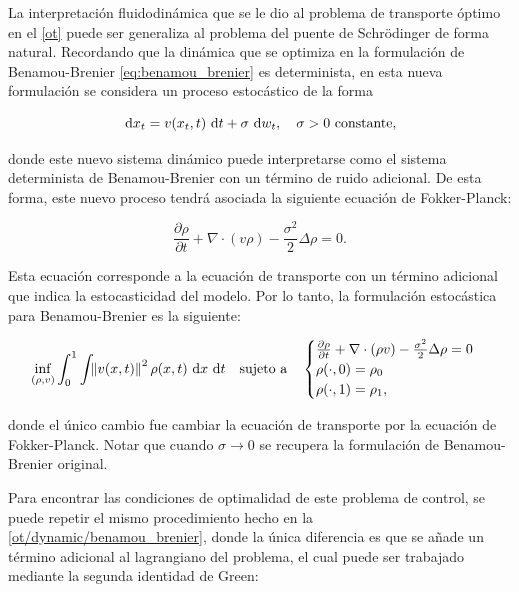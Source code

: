 La interpretación fluidodinámica que se le dio al problema de transporte óptimo en el \autoref{ot} puede ser generaliza al problema del puente de Schrödinger de forma natural. Recordando que la dinámica que se optimiza en la formulación de Benamou-Brenier \eqref{eq:benamou_brenier} es determinista, en esta nueva formulación se considera un proceso estocástico de la forma

\begin{equation*}
	\,\operatorname{d}\! x_t = v(x_t,t)\,\operatorname{d}\! t + \sigma\,\operatorname{d}\! w_t, \quad \sigma>0\text{ constante},
\end{equation*}

donde este nuevo sistema dinámico puede interpretarse como el sistema determinista de Benamou-Brenier con un término de ruido adicional. De esta forma, este nuevo proceso tendrá asociada la siguiente ecuación de Fokker-Planck:

\begin{equation*}
	\frac{\partial\rho}{\partial t} + \nabla\cdot(v\rho) - \frac{\sigma^2}{2}\Delta\rho = 0.
\end{equation*}

Esta ecuación corresponde a la ecuación de transporte con un término adicional que indica la estocasticidad del modelo. Por lo tanto, la formulación estocástica para Benamou-Brenier es la siguiente:

\begin{equation}
	\label{eq:benamou_brenier_sbp}
	\inf_{(\rho,v)} \int_0^1 \int_{} \left\lVert v(x,t) \right\rVert^2 \rho(x,t) \,\operatorname{d}\! x\,\operatorname{d}\! t
	\quad \text{sujeto a} \quad
	\begin{cases}
		\frac{\partial \rho}{\partial t} + \nabla\cdot(\rho v) - \frac{\sigma^2}{2}\Delta\rho = 0\\
		\rho(\cdot,0) = \rho_0\\
		\rho(\cdot,1) = \rho_1,
	\end{cases}
\end{equation}

donde el único cambio fue cambiar la ecuación de transporte por la ecuación de Fokker-Planck. Notar que cuando $\sigma\to 0$ se recupera la formulación de Benamou-Brenier original.

Para encontrar las condiciones de optimalidad de este problema de control, se puede repetir el mismo procedimiento hecho en la \autoref{ot/dynamic/benamou_brenier}, donde la única diferencia es que se añade un término adicional al lagrangiano del problema, el cual puede ser trabajado mediante la segunda identidad de Green:

